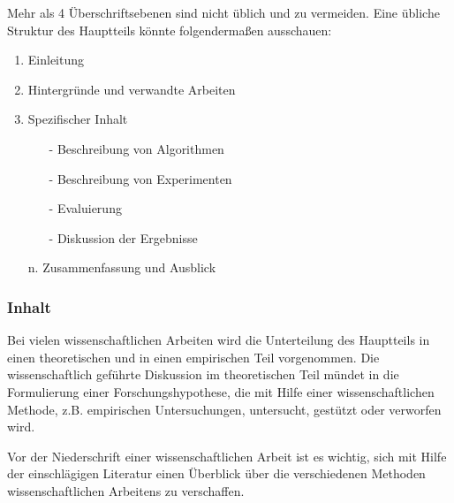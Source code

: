 Mehr als 4 Überschriftsebenen sind nicht üblich und zu vermeiden. Eine übliche Struktur des Hauptteils könnte folgendermaßen ausschauen:
\begin{enumerate}
  \item Einleitung
  \item Hintergründe und verwandte Arbeiten
  \item Spezifischer Inhalt
  \begin{itemize}
    \item[-] Beschreibung von Algorithmen
    \item[-] Beschreibung von Experimenten
    \item[-] Evaluierung
    \item[-] Diskussion der Ergebnisse
  \end{itemize}
  \item[n.] Zusammenfassung und Ausblick
\end{enumerate}

\subsubsection{Inhalt}\label{sec:structure:main:content}
%
Bei vielen wissenschaftlichen Arbeiten wird die Unterteilung des Hauptteils in einen theoretischen und in einen empirischen Teil vorgenommen. Die wissenschaftlich geführte Diskussion im theoretischen Teil mündet in die Formulierung einer Forschungshypothese, die mit Hilfe einer wissenschaftlichen Methode, z.B. empirischen Untersuchungen, untersucht, gestützt oder verworfen wird.

Vor der Niederschrift einer wissenschaftlichen Arbeit ist es wichtig, sich mit Hilfe der einschlägigen Literatur einen Überblick über die verschiedenen Methoden wissenschaftlichen Arbeitens zu verschaffen.

